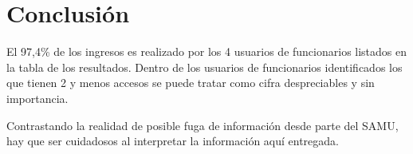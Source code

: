 \documentclass{article}
\begin{document}
\section{Conclusión}
El 97,4\% de los ingresos es realizado por  los 4 usuarios de funcionarios listados en la tabla de los resultados. Dentro de los usuarios de funcionarios identificados los que tienen 2 y menos accesos se puede tratar como cifra despreciables y sin importancia.

Contrastando la realidad de posible fuga de información desde parte del SAMU, hay que ser cuidadosos al interpretar la información aquí entregada.
\end{document}
